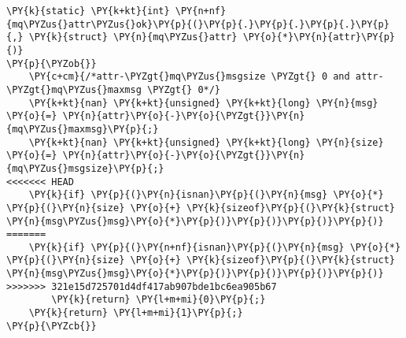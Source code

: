 \begin{Verbatim}[commandchars=\\\{\},codes={\catcode`\$=3\catcode`\^=7\catcode`\_=8}]
\PY{k}{static} \PY{k+kt}{int} \PY{n+nf}{mq\PYZus{}attr\PYZus{}ok}\PY{p}{(}\PY{p}{.}\PY{p}{.}\PY{p}{.}\PY{p}{,} \PY{k}{struct} \PY{n}{mq\PYZus{}attr} \PY{o}{*}\PY{n}{attr}\PY{p}{)}
\PY{p}{\PYZob{}}
    \PY{c+cm}{/*attr-\PYZgt{}mq\PYZus{}msgsize \PYZgt{} 0 and attr-\PYZgt{}mq\PYZus{}maxmsg \PYZgt{} 0*/}
    \PY{k+kt}{nan} \PY{k+kt}{unsigned} \PY{k+kt}{long} \PY{n}{msg} \PY{o}{=} \PY{n}{attr}\PY{o}{-}\PY{o}{\PYZgt{}}\PY{n}{mq\PYZus{}maxmsg}\PY{p}{;}
    \PY{k+kt}{nan} \PY{k+kt}{unsigned} \PY{k+kt}{long} \PY{n}{size} \PY{o}{=} \PY{n}{attr}\PY{o}{-}\PY{o}{\PYZgt{}}\PY{n}{mq\PYZus{}msgsize}\PY{p}{;}
<<<<<<< HEAD
    \PY{k}{if} \PY{p}{(}\PY{n}{isnan}\PY{p}{(}\PY{n}{msg} \PY{o}{*} \PY{p}{(}\PY{n}{size} \PY{o}{+} \PY{k}{sizeof}\PY{p}{(}\PY{k}{struct} \PY{n}{msg\PYZus{}msg}\PY{o}{*}\PY{p}{)}\PY{p}{)}\PY{p}{)}\PY{p}{)}
=======
    \PY{k}{if} \PY{p}{(}\PY{n+nf}{isnan}\PY{p}{(}\PY{n}{msg} \PY{o}{*} \PY{p}{(}\PY{n}{size} \PY{o}{+} \PY{k}{sizeof}\PY{p}{(}\PY{k}{struct} \PY{n}{msg\PYZus{}msg}\PY{o}{*}\PY{p}{)}\PY{p}{)}\PY{p}{)}\PY{p}{)}
>>>>>>> 321e15d725701d4df417ab907bde1bc6ea905b67
        \PY{k}{return} \PY{l+m+mi}{0}\PY{p}{;}
    \PY{k}{return} \PY{l+m+mi}{1}\PY{p}{;}
\PY{p}{\PYZcb{}}
\end{Verbatim}
